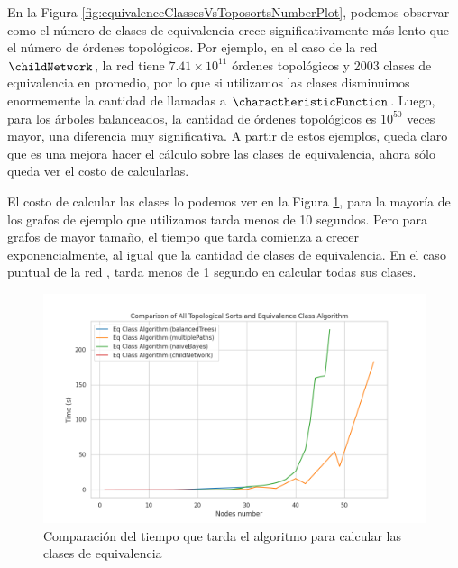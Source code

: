 En la Figura \ref{fig:equivalenceClassesVsToposortsNumberPlot}, podemos observar como el número de clases de equivalencia crece significativamente más lento que el número de órdenes topológicos. Por ejemplo, en el caso de la red $\childNetwork$, la red tiene $7.41\times10^{11}$ órdenes topológicos y 2003 clases de equivalencia en promedio, por lo que si utilizamos las clases disminuimos enormemente la cantidad de llamadas a $\charactheristicFunction$. Luego, para los árboles balanceados, la cantidad de órdenes topológicos es $10^{50}$ veces mayor, una diferencia muy significativa. A partir de estos ejemplos, queda claro que es una mejora hacer el cálculo sobre las clases de equivalencia, ahora sólo queda ver el costo de calcularlas. 

El costo de calcular las clases lo podemos ver en la Figura \ref{fig:equivalenceClassesTimePlot}, para la mayoría de los grafos de ejemplo que utilizamos tarda menos de 10 segundos. Pero para grafos de mayor tamaño, el tiempo que tarda comienza a crecer exponencialmente, al igual que la cantidad de clases de equivalencia. En el caso puntual de la red \childNetwork, tarda menos de 1 segundo en calcular todas sus clases. 


\begin{figure}[ht]
    \centering
    \includegraphics[width=1\linewidth]{img/equivalentClasses_time.png}
    \caption[Caption for image]{Comparación del tiempo que tarda el algoritmo para calcular las clases de equivalencia}
    \label{fig:equivalenceClassesTimePlot}
\end{figure}

